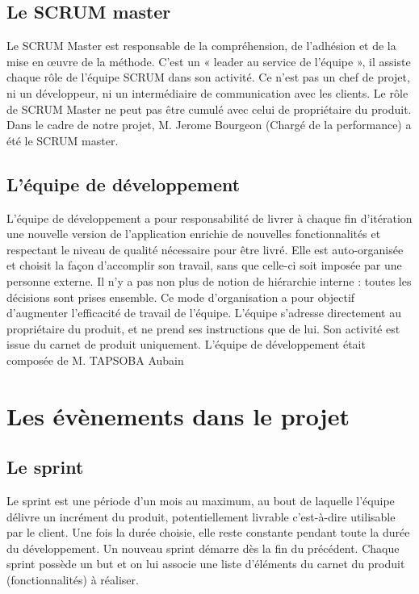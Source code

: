 \documentclass[a4paper,12pt]{book}
\theoremstyle{break}
\begin{document}
\subsection{Le SCRUM master}
Le SCRUM Master est responsable de la compréhension, de l'adhésion et de la mise en œuvre de la méthode. C'est un « leader au service de l'équipe », il assiste chaque rôle de l'équipe SCRUM dans son activité. Ce n'est pas un chef de projet, ni un développeur, ni un intermédiaire de communication avec les clients. Le rôle de SCRUM Master ne peut pas être cumulé avec celui de propriétaire du produit.
Dans le cadre de notre projet, M. Jerome Bourgeon (Chargé de la performance) a été le SCRUM master.

\subsection{L'équipe de développement}
L'équipe de développement a pour responsabilité de livrer à chaque fin d'itération une nouvelle version de l'application enrichie de nouvelles fonctionnalités et respectant le niveau de qualité nécessaire pour être livré. Elle est auto-organisée et choisit la façon d'accomplir son travail, sans que celle-ci soit imposée par une personne externe. Il n'y a pas non plus de notion de hiérarchie interne : toutes les décisions sont prises ensemble. Ce mode d'organisation a pour objectif d'augmenter l'efficacité de travail de l'équipe. L'équipe s'adresse directement au propriétaire du produit, et ne prend ses instructions que de lui. Son activité est issue du carnet de produit uniquement.
L'équipe de développement était composée de M. TAPSOBA Aubain 

\section{Les évènements dans le projet}
\subsection{Le sprint}
Le sprint est une période d'un mois au maximum, au bout de laquelle l'équipe délivre un incrément du produit, potentiellement livrable c’est-à-dire utilisable par le client. Une fois la durée choisie, elle reste constante pendant toute la durée du développement. Un nouveau sprint démarre dès la fin du précédent.
Chaque sprint possède un but et on lui associe une liste d'éléments du carnet du produit (fonctionnalités) à réaliser.
\end{document}
